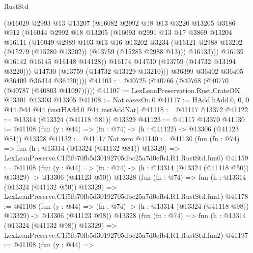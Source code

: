 \begin{lexlean}{RustStd}
\begin{coremodule}
                (@16029
                  @2993
                  @13
                  @13207
                  (@16082
                    @2992
                    @18
                    @13
                    @3220
                    @13205
                    @3186
                    @912
                    (@16044
                      @2992
                      @18
                      @13205
                      (@16093
                        @2991
                        @13
                        @17
                        @3869
                        @13204
                        @16111
                        (@16049
                          @2989
                          @103
                          @13
                          @16
                          @13202
                          @3234
                          (@16121 @2988 @13202 (@15279 (@15280 @13202)) (@13759 (@15285 @2988 @13)))
                          @16133)))
                    @16139
                    @16142
                    @16145
                    @16148
                    @14128))
                @16174
                @14730
                (@13759 (@14732 @13194 @3220)))
              @14730
              (@13759 (@14732 @13129 @13210)))
            @36399
            @36402
            @36405
            @36409
            @36414
            @36420))))
@41103 := @40725 (@40766 (@40768 (@40770 (@40787 (@40803 @41097)))))
@41107 := LexLeanPreservation.Rust.CrateOK @13301 @13303 @13305
@41108 := Nat.casesOn.{0}
@41117 := HAdd.hAdd.{0, 0, 0} @44 @44 @44 (instHAdd.{0} @44 instAddNat)
@41118 := @41117 @13372
@41122 := @13314 (@13324 (@41118 @81)) @13329
@41123 := @41117 @13370
@41130 := @41108 (fun (y : @44) => (fn : @74) -> (h : @41122) -> @13306 (@41123 @81)) @13328
@41132 := @41117 Nat.zero
@41140 := @41130
    (fun (fn : @74) =>
    fun (h : @13314 (@13324 (@41132 @81)) @13329) =>
    LexLeanPreserve.C1f5fb70fb5d30192705dbc25a7d0efb4.R1.RustStd.fun0)
@41159 := @41108
    (fun (y : @44) =>
    (fn : @74) -> (h : @13314 (@13324 (@41118 @50)) @13329) -> @13306 (@41123 @50))
    @13328
    (fun (fn : @74) =>
    fun (h : @13314 (@13324 (@41132 @50)) @13329) =>
    LexLeanPreserve.C1f5fb70fb5d30192705dbc25a7d0efb4.R1.RustStd.fun1)
@41178 := @41108
    (fun (y : @44) =>
    (fn : @74) -> (h : @13314 (@13324 (@41118 @98)) @13329) -> @13306 (@41123 @98))
    @13328
    (fun (fn : @74) =>
    fun (h : @13314 (@13324 (@41132 @98)) @13329) =>
    LexLeanPreserve.C1f5fb70fb5d30192705dbc25a7d0efb4.R1.RustStd.fun2)
@41197 := @41108
    (fun (y : @44) =>

\end{coremodule}
\end{lexlean}
